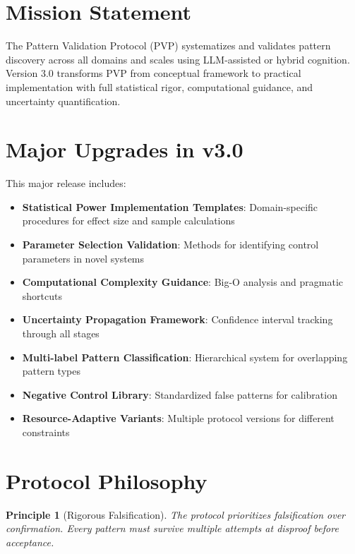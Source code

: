 \documentclass[12pt,oneside]{memoir}
\theoremstyle{plain}
\newtheorem{principle}[theorem]{Principle}
\theoremstyle{definition}
\theoremstyle{remark}
\newcommand{\PVP}{\textsc{PVP}}
\begin{document}
\section{Mission Statement}

The Pattern Validation Protocol (\PVP{}) systematizes and validates pattern discovery across all domains and scales using LLM-assisted or hybrid cognition. Version 3.0 transforms \PVP{} from conceptual framework to practical implementation with full statistical rigor, computational guidance, and uncertainty quantification.

\section{Major Upgrades in v3.0}

This major release includes:

\begin{itemize}
\item[\checkmark] \textbf{Statistical Power Implementation Templates}: Domain-specific procedures for effect size and sample calculations
\item[\checkmark] \textbf{Parameter Selection Validation}: Methods for identifying control parameters in novel systems
\item[\checkmark] \textbf{Computational Complexity Guidance}: Big-O analysis and pragmatic shortcuts
\item[\checkmark] \textbf{Uncertainty Propagation Framework}: Confidence interval tracking through all stages
\item[\checkmark] \textbf{Multi-label Pattern Classification}: Hierarchical system for overlapping pattern types
\item[\checkmark] \textbf{Negative Control Library}: Standardized false patterns for calibration
\item[\checkmark] \textbf{Resource-Adaptive Variants}: Multiple protocol versions for different constraints
\end{itemize}

\section{Protocol Philosophy}

\begin{principle}[Rigorous Falsification]
The protocol prioritizes falsification over confirmation. Every pattern must survive multiple attempts at disproof before acceptance.
\end{principle}
\end{document}

